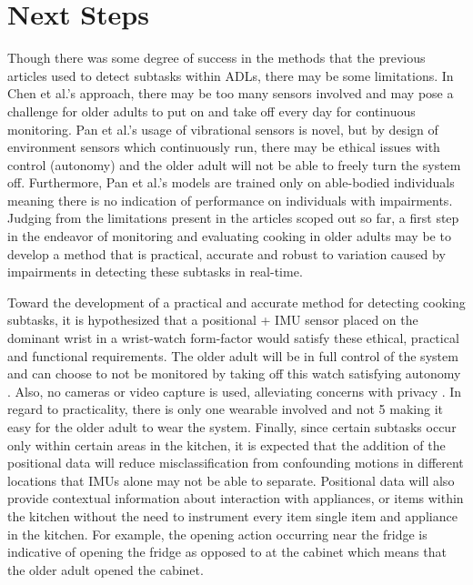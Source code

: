 \section{Next Steps}
Though there was some degree of success in the methods that the previous articles used to detect subtasks within ADLs, there may be some limitations. In Chen et al.'s approach, there may be too many sensors involved and may pose a challenge for older adults to put on and take off every day for continuous monitoring. Pan et al.'s usage of vibrational sensors is novel, but by design of environment sensors which continuously run, there may be ethical issues with control (autonomy) and the older adult will not be able to freely turn the system off. Furthermore, Pan et al.'s models are trained only on able-bodied individuals meaning there is no indication of performance on individuals with impairments. Judging from the limitations present in the articles scoped out so far, a first step in the endeavor of monitoring and evaluating cooking in older adults may be to develop a method that is practical, accurate and robust to variation caused by impairments in detecting these subtasks in real-time. 

Toward the development of a practical and accurate method for detecting cooking subtasks, it is hypothesized that a positional + IMU sensor placed on the dominant wrist in a wrist-watch form-factor would satisfy these ethical, practical and functional requirements. The older adult will be in full control of the system and can choose to not be monitored by taking off this watch satisfying autonomy \cite{chung_ethical_2016}. Also, no cameras or video capture is used, alleviating concerns with privacy \cite{demiris_privacy_2009}. In regard to practicality, there is only one wearable involved and not 5 \cite{chen_measuring_2021} making it easy for the older adult to wear the system. Finally, since certain subtasks occur only within certain areas in the kitchen, it is expected that the addition of the positional data will reduce misclassification from confounding motions in different locations that IMUs alone may not be able to separate. Positional data will also provide contextual information about interaction with appliances, or items within the kitchen without the need to instrument every item single item and appliance in the kitchen. For example, the opening action occurring near the fridge is indicative of opening the fridge as opposed to at the cabinet which means that the older adult opened the cabinet. 

